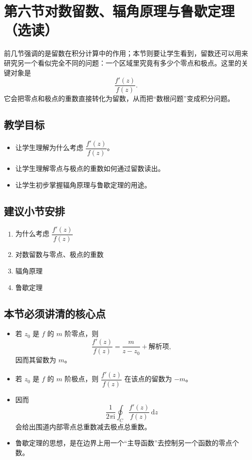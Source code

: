 \section{第六节\quad 对数留数、辐角原理与鲁歇定理（选读）}

\begin{wulibj}[本节要解决的问题]
前几节强调的是留数在积分计算中的作用；本节则要让学生看到，留数还可以用来研究另一个看似完全不同的问题：一个区域里究竟有多少个零点和极点。这里的关键对象是
\[
    \frac{f'(z)}{f(z)}.
\]
它会把零点和极点的重数直接转化为留数，从而把``数根问题''变成积分问题。
\end{wulibj}

\subsection*{教学目标}
\begin{itemize}
    \item 让学生理解为什么考虑 $\dfrac{f'(z)}{f(z)}$。
    \item 让学生理解零点与极点的重数如何通过留数读出。
    \item 让学生初步掌握辐角原理与鲁歇定理的用途。
\end{itemize}

\subsection*{建议小节安排}
\begin{enumerate}
    \item 为什么考虑 $\dfrac{f'(z)}{f(z)}$
    \item 对数留数与零点、极点的重数
    \item 辐角原理
    \item 鲁歇定理
\end{enumerate}

\subsection*{本节必须讲清的核心点}
\begin{itemize}
    \item 若 $z_0$ 是 $f$ 的 $m$ 阶零点，则
    \[
        \frac{f'(z)}{f(z)}
        =
        \frac{m}{z-z_0}+\text{解析项},
    \]
    因而其留数为 $m$。
    \item 若 $z_0$ 是 $f$ 的 $m$ 阶极点，则 $\dfrac{f'(z)}{f(z)}$ 在该点的留数为 $-m$。
    \item 因而
    \[
        \frac{1}{2\pi \mathrm{i}}\oint_C \frac{f'(z)}{f(z)}\,\mathrm{d}z
    \]
    会给出围道内部零点总重数减去极点总重数。
    \item 鲁歇定理的思想，是在边界上用一个``主导函数''去控制另一个函数的零点个数。
\end{itemize}

